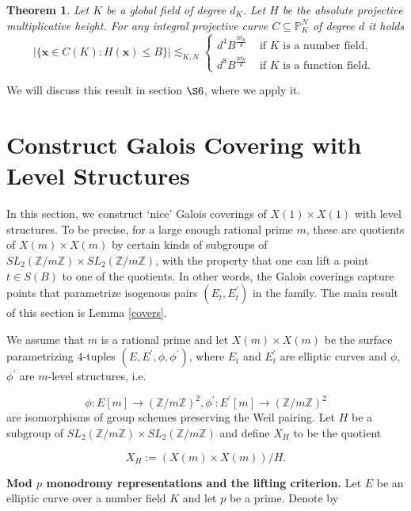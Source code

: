 \documentclass[12pt]{amsart}
\newtheorem{thm}{Theorem}[section]
\theoremstyle{definition}
\theoremstyle{remark}
\numberwithin{equation}{section}
\newcommand{\Z}{\mathbb{Z}}
\begin{document}
\begin{thm}\cite[Theorem 1.8]{PS22} \label{PS}
Let $K$ be a global field of degree $d_K$. Let $H$ be the absolute projective multiplicative height. For any integral projective curve $C \subseteq \mathbb{P}_K^N$ of degree $d$ it holds
$$
|\{\boldsymbol{x} \in C(K): H(\boldsymbol{x}) \leq B\}| \lesssim_{K, N} \begin{cases}d^4 B^{\frac{2 d_K}{d}} & \text { if } K \text { is a number field, } \\ d^8 B^{\frac{2 d_K}{d}} & \text { if } K \text { is a function field. }\end{cases}
$$
\end{thm}

We will discuss this result in section $\S 6$, where we apply it.



\section{Construct Galois Covering with Level Structures}

In this section, we construct `nice' Galois coverings of $X(1) \times X(1)$ with level structures. To be precise, for a large enough rational prime $m$, these are quotients of $X(m) \times X(m)$ by certain kinds of subgroups of $SL_{2}(\Z/m\Z) \times SL_{2}(\Z/m\Z)$, with the property that one can lift a point $t \in S(B)$ to one of the quotients. In other words, the Galois coverings capture points that parametrize isogenous pairs  $(E_{t}, E^{\prime}_{t})$ in the family. The main result of this section is Lemma \ref{covers}. 

\vspace{1em} 

We assume that $m$ is a rational prime and let $X(m) \times X(m)$ be the surface parametrizing $4$-tuples $(E, E^{\prime},\phi,\phi^{\prime})$, where $E_{t}$ and $E^{\prime}_{t}$ are elliptic curves and $\phi$, $\phi^{\prime}$ are $m$-level structures, i.e. 

$$\phi: E[m] \to (\Z/m\Z)^{2}, \phi^{\prime}: E^{\prime}[m] \to (\Z /m\Z)^{2}$$
are isomorphisms of group schemes preserving the Weil pairing. Let $H$ be a subgroup of $SL_{2}(\Z/m\Z) \times SL_{2}(\Z/m\Z)$ and define $X_{H}$ to be the quotient 

\begin{equation}\label{XH}
	X_{H}:= (X(m) \times X(m))/H.
\end{equation}

\vspace{1em}
\noindent \textbf{Mod $p$ monodromy representations and the lifting criterion.} Let $E$ be an elliptic curve over a number field $K$ and let $p$ be a prime. Denote by 
\end{document}

